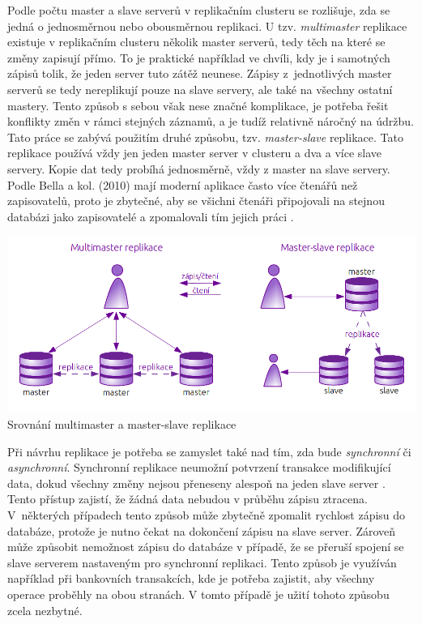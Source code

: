   Podle počtu master a slave serverů v replikačním clusteru se rozlišuje, zda
  se jedná o jednosměrnou nebo obousměrnou replikaci. U tzv. {\it multimaster}
  replikace existuje v replikačním clusteru několik master serverů, tedy těch
  na které se změny zapisují přímo. To je praktické například ve chvíli, kdy je
  i samotných zápisů tolik, že jeden server tuto zátěž neunese. Zápisy z~jednotlivých master serverů se tedy
  nereplikují pouze na slave servery, ale také na všechny ostatní mastery.
  Tento způsob s sebou však nese značné komplikace, je potřeba řešit konflikty
  změn v rámci stejných záznamů, a je tudíž relativně náročný na údržbu. Tato
  práce se zabývá použitím druhé způsobu, tzv. {\it master-slave} replikace.
  Tato replikace používá vždy jen jeden master server v clusteru a dva a více
  slave servery. Kopie dat tedy probíhá jednosměrně, vždy z master na slave
  servery. Podle Bella a kol. (2010) mají moderní aplikace často více čtenářů
  než zapisovatelů, proto je zbytečné, aby se všichni čtenáři při\-po\-jo\-va\-li na
  stejnou databázi jako zapisovatelé a zpomalovali tím jejich práci
  \cite{BellKindahlThalmann2010}.

  \begin{center}
    \includegraphics[width=\textwidth]{obr/schema_masterMasterSlave.png}
       Srovnání multimaster a master-slave replikace
  \end{center}
  Při návrhu replikace je potřeba se zamyslet také nad tím, zda bude {\it
  synchronní} či {\it asynchronní}. Synchronní replikace neumožní potvrzení
  transakce modifikující data, dokud všechny změny nejsou přeneseny alespoň na
  jeden slave server \cite{Boszormenyi2013}. Tento přístup zajistí, že žádná
  data nebudou v průběhu zápisu ztracena. V~některých případech tento způsob
  může zbytečně zpomalit rychlost zápisu do databáze, protože je nutno čekat na
  dokončení zápisu na slave server. Zároveň může způsobit nemožnost zápisu do
  databáze v případě, že se přeruší spojení se slave serverem nastaveným pro
  synchronní replikaci. Tento způsob je využíván například při bankovních
  transakcích, kde je potřeba zajistit, aby všechny operace proběhly na obou
  stranách. V tomto případě je užití tohoto způsobu zcela nezbytné. 

